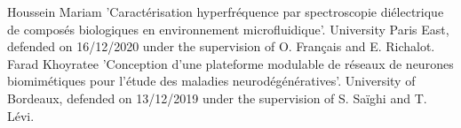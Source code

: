 \begin{cvskills}
\cvskill
    {Houssein Mariam} %
    {'Caractérisation hyperfréquence par spectroscopie diélectrique de composés biologiques en environnement microfluidique'. University Paris East, defended on  16/12/2020 under the supervision of O. Français and E. Richalot.
    } %
\cvskill
    {Farad Khoyratee} %
    {'Conception d’une plateforme modulable de réseaux de neurones biomimétiques pour l’étude des maladies neurodégénératives'. University of Bordeaux, defended on 13/12/2019 under the supervision of S. Saïghi and T. Lévi.
    } %
\end{cvskills}